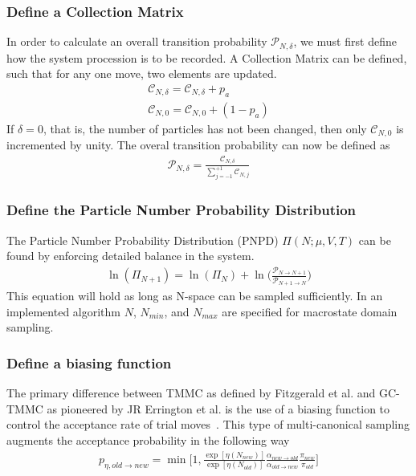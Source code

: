 \documentclass[letterpaper,twocolumn,amsmath,amssymb,pre,aps,10pt]{revtex4-1}
\begin{document}
\subsubsection{Define a Collection Matrix}
In order to calculate an overall transition probability $\mathcal{P}_{N,\delta}$, we
must first define how the system procession is to be recorded.  A Collection Matrix
can be defined, such that for any one move, two elements are updated.
\begin{align}
  \mathcal{C}_{N,\delta} = \mathcal{C}_{N,\delta} + p_{a}\\
  \mathcal{C}_{N,0} = \mathcal{C}_{N,0} +(1 - p_{a})
\end{align}  
If $\delta=0$, that is, the number of particles has not been changed, then only 
$\mathcal{C}_{N,0}$ is incremented by unity.  The overal transition probability can
now be defined as 
\begin{align}
  \mathcal{P}_{N,\delta} = \frac{\mathcal{C}_{N,\delta}}
  {\sum_{j=-1}^{+1} \mathcal{C}_{N,j}}
\end{align} 

\subsubsection{Define the Particle Number Probability Distribution}
The Particle Number Probability Distribution (PNPD) $\Pi(N;\mu,V,T)$ can be found 
by enforcing detailed balance in the system.
\begin{align}
  \ln(\Pi_{N+1}) = \ln(\Pi_{N}) + \ln\bigg(\frac{\mathcal{P}_{N\rightarrow N+1}}
  {\mathcal{P}_{N+1\rightarrow N}}\bigg)
\end{align} 
This equation will hold as long as N-space can be sampled sufficiently.  In an 
implemented algorithm $N$, $N_{min}$, and $N_{max}$ are specified for macrostate domain
sampling.

\subsubsection{Define a biasing function}
The primary difference between TMMC as defined by Fitzgerald et al. and GC-TMMC as 
pioneered by JR Errington et al. is the use of a biasing function to control the acceptance
rate of trial moves~\cite{siderius2013use, fitzgerald2000monte}.  This type of 
multi-canonical sampling augments the acceptance probability in the following way 
\begin{align}
  p_{\eta,old\rightarrow new} = \min\bigg[1,\frac{\exp[\eta(N_{new})]}
  {\exp[\eta(N_{old})]}\frac{\alpha_{new\rightarrow old}}
  {\alpha_{old \rightarrow new}}\frac{\pi_{new}}{\pi_{old}}\bigg]
\end{align}
\end{document}
